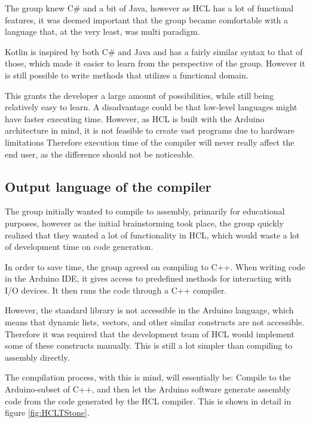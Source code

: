 The group knew C\# and a bit of Java, however as HCL has a lot of functional features, it was deemed important that the group became comfortable with a language that, at the very least, was multi paradigm.

Kotlin is inspired by both C\# and Java and has a fairly similar syntax to that of those, which made it easier to learn from the perspective of the group.
However it is still possible to write methods that utilizes a functional domain.

This grants the developer a large amount of possibilities, while still being relatively easy to learn.
A disadvantage could be that low-level languages might have faster executing time. 
However, as HCL is built with the Arduino architecture in mind, it is not feasible to create vast programs due to hardware limitations
Therefore execution time of the compiler will never really affect the end user, as the difference should not be noticeable.

\subsection{Output language of the compiler}
The group initially wanted to compile to assembly, primarily for educational purposes, however as the initial brainstorming took place, the group quickly realized that they wanted a lot of functionality in HCL, which would waste a lot of development time on code generation.

In order to save time, the group agreed on compiling to C++.
When writing code in the Arduino IDE, it gives access to predefined methods for interacting with I/O devices.
It then runs the code through a C++ compiler\cite{ArFAQ}.

However, the standard library is not accessible in the Arduino language, which means that dynamic lists, vectors, and other similar constructs are not accessible.
Therefore it was required that the development team of HCL would implement some of these constructs manually.
This is still a lot simpler than compiling to assembly directly. 

The compilation process, with this is mind, will essentially be: Compile to the Arduino-subset of C++, and then let the Arduino software generate assembly code from the code generated by the HCL compiler.
This is shown in detail in figure \ref{fig:HCLTStone}.

